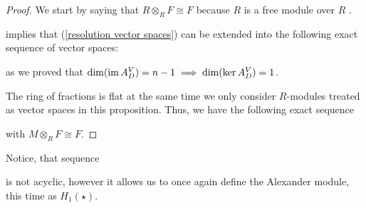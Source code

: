 \begin{proof} We start by saying that $R\otimes_R F\cong F$ because $R$ is a free module over $R$ \cite[Proposition~2.14]{atiyah}.

    implies that (\ref{resolution vector spaces}) can be extended into the following exact sequence of vector spaces:
   \begin{center}
   \end{center}
   as we proved that $\dim(\operatorname{im} A_D^V)=n-1\implies \dim(\ker A_D^V)=1$.

  The ring of fractions is flat \cite[Chapter~3]{atiyah} at the same time we only consider $R$-modules treated as vector spaces in this proposition. Thus, we have the following exact sequence
  \begin{center}
  \end{center}
  with $M\otimes_R F\cong F$.
\end{proof}

Notice, that sequence
\begin{center}
\end{center}
is not acyclic, however it allows us to once again define the Alexander module, this time as $H_1(\star)$.
